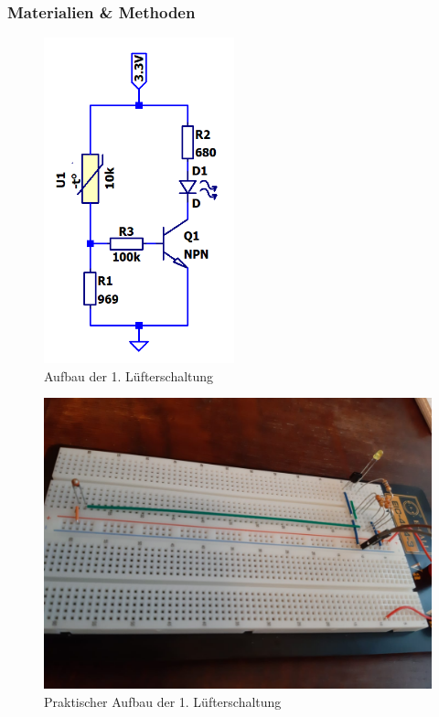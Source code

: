 \cite{formelsammlung}

\clearpage
\subsubsection{Materialien \& Methoden}

\begin{figure}[htb]
    \includegraphics[width=5.5cm]{./res/Luefter_1_Spice}
    \caption{Aufbau der 1. Lüfterschaltung}
    \label{fig:Lüfterschaltung1}
\end{figure}

\begin{figure}[htb]
    \includegraphics[width=12cm]{./res/Luefter_1_Aufbau}
    \caption{Praktischer Aufbau der 1. Lüfterschaltung}
    \label{fig:Lüfterschaltung1Praktisch}
\end{figure}

